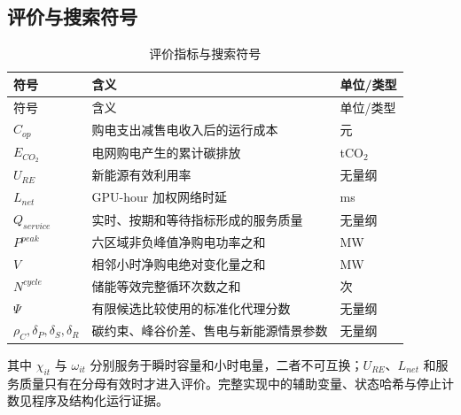\subsection{评价与搜索符号}
\begin{longtable}{p{}p{}p{}}
\caption{评价指标与搜索符号}\label{tab:symbol-metric}\\
\toprule 符号 & 含义 & 单位/类型\\ \midrule\endfirsthead
\toprule 符号 & 含义 & 单位/类型\\ \midrule\endhead
\bottomrule\endfoot
$C_{op}$ & 购电支出减售电收入后的运行成本 & 元\\
$E_{CO_2}$ & 电网购电产生的累计碳排放 & tCO$_2$\\
$U_{RE}$ & 新能源有效利用率 & 无量纲\\
$L_{net}$ & GPU-hour 加权网络时延 & ms\\
$Q_{service}$ & 实时、按期和等待指标形成的服务质量 & 无量纲\\
$P^{peak}$ & 六区域非负峰值净购电功率之和 & MW\\
$V$ & 相邻小时净购电绝对变化量之和 & MW\\
$N^{cycle}$ & 储能等效完整循环次数之和 & 次\\
$\Psi$ & 有限候选比较使用的标准化代理分数 & 无量纲\\
$\rho_C,\delta_P,\delta_S,\delta_R$ & 碳约束、峰谷价差、售电与新能源情景参数 & 无量纲\\
\end{longtable}

其中 $\chi_{it}$ 与 $\omega_{it}$ 分别服务于瞬时容量和小时电量，二者不可互换；$U_{RE}$、$L_{net}$ 和服务质量只有在分母有效时才进入评价。完整实现中的辅助变量、状态哈希与停止计数见程序及结构化运行证据。
